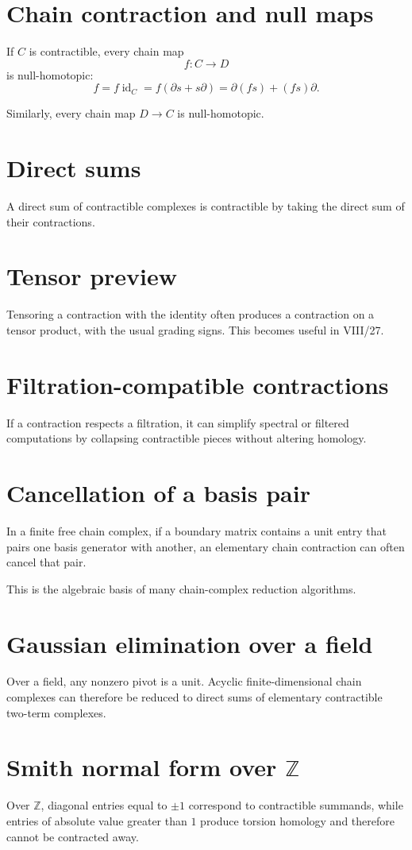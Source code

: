 \section{Chain contraction and null maps}
If \(C\) is contractible, every chain map
\[
f:C\to D
\]
is null-homotopic:
\[
f=f\operatorname{id}_C
=f(\partial s+s\partial)
=\partial(fs)+(fs)\partial.
\]

Similarly, every chain map \(D\to C\) is null-homotopic.

\section{Direct sums}
A direct sum of contractible complexes is contractible by taking the direct sum
of their contractions.

\section{Tensor preview}
Tensoring a contraction with the identity often produces a contraction on a
tensor product, with the usual grading signs.  This becomes useful in VIII/27.

\section{Filtration-compatible contractions}
If a contraction respects a filtration, it can simplify spectral or filtered
computations by collapsing contractible pieces without altering homology.

\section{Cancellation of a basis pair}
In a finite free chain complex, if a boundary matrix contains a unit entry that
pairs one basis generator with another, an elementary chain contraction can
often cancel that pair.

This is the algebraic basis of many chain-complex reduction algorithms.

\section{Gaussian elimination over a field}
Over a field, any nonzero pivot is a unit.  Acyclic finite-dimensional chain
complexes can therefore be reduced to direct sums of elementary contractible
two-term complexes.

\section{Smith normal form over \(\mathbb Z\)}
Over \(\mathbb Z\), diagonal entries equal to \(\pm1\) correspond to
contractible summands, while entries of absolute value greater than \(1\)
produce torsion homology and therefore cannot be contracted away.

